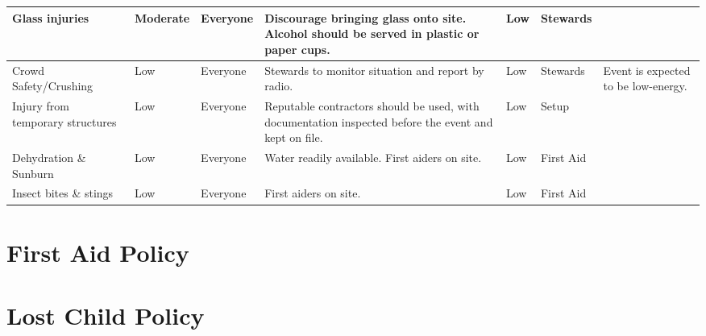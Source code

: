 \begin{landscape}
\begin{tabular}{| p{3cm} | l | p{1.5cm} | p{9cm} | p{1.5cm} | p{2cm} | p{6cm} |}
Glass injuries & Moderate & Everyone &
Discourage bringing glass onto site. Alcohol should be served in plastic or paper cups. &
Low & Stewards & \\ \hline

Crowd Safety/Crushing & Low & Everyone &
Stewards to monitor situation and report by radio. &
Low & Stewards & Event is expected to be low-energy. \\ \hline

Injury from temporary structures & Low & Everyone &
Reputable contractors should be used, with documentation inspected before the event and kept on file. &
Low & Setup & \\ \hline

Dehydration \& Sunburn & Low & Everyone &
Water readily available. First aiders on site. & Low & First Aid & \\ \hline

Insect bites \& stings & Low & Everyone &
First aiders on site. & Low & First Aid & \\ \hline

\end{tabular}

\end{landscape}
\restoregeometry

\appendix

\section{First Aid Policy}
\label{first-aid-policy}

\newpage

\section{Lost Child Policy}
\label{lost-child-policy}


